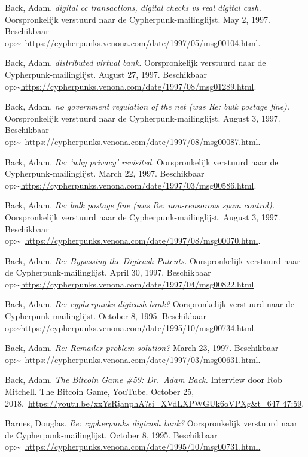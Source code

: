 \documentclass[smalldemyvopaper,11pt,twoside,onecolumn,openright,extrafontsizes,hidelinks]{memoir}
\begin{document}
Back, Adam. \emph{digital cc transactions, digital checks vs real
digital cash.} Oorspronkelijk verstuurd naar de Cypherpunk-mailinglijst.
May 2, 1997. Beschikbaar
op:\textasciitilde~\url{https://cypherpunks.venona.com/date/1997/05/msg00104.html}.

Back, Adam. \emph{distributed virtual bank.} Oorspronkelijk verstuurd
naar de Cypherpunk-mailinglijst. August 27, 1997. Beschikbaar
op:\textasciitilde{}\url{https://cypherpunks.venona.com/date/1997/08/msg01289.html}.

Back, Adam. \emph{no government regulation of the net (was Re: bulk
postage fine).} Oorspronkelijk verstuurd naar de
Cypherpunk-mailinglijst. August 3, 1997. Beschikbaar
op:\textasciitilde~\url{https://cypherpunks.venona.com/date/1997/08/msg00087.html}.

Back, Adam. \emph{Re: `why privacy' revisited.} Oorspronkelijk verstuurd
naar de Cypherpunk-mailinglijst. March 22, 1997. Beschikbaar
op:\textasciitilde{}\url{https://cypherpunks.venona.com/date/1997/03/msg00586.html}.

Back, Adam. \emph{Re: bulk postage fine (was Re: non-censorous spam
control).} Oorspronkelijk verstuurd naar de Cypherpunk-mailinglijst.
August 3, 1997. Beschikbaar
op:\textasciitilde~\url{https://cypherpunks.venona.com/date/1997/08/msg00070.html}.

Back, Adam. \emph{Re: Bypassing the Digicash Patents.} Oorspronkelijk
verstuurd naar de Cypherpunk-mailinglijst. April 30, 1997. Beschikbaar
op:\textasciitilde{}\url{https://cypherpunks.venona.com/date/1997/04/msg00822.html}.

Back, Adam. \emph{Re: cypherpunks digicash bank?} Oorspronkelijk
verstuurd naar de Cypherpunk-mailinglijst. October 8, 1995. Beschikbaar
op:\textasciitilde{}\url{https://cypherpunks.venona.com/date/1995/10/msg00734.html}.

Back, Adam. \emph{Re: Remailer problem solution?} March 23, 1997.
Beschikbaar
op:\textasciitilde~\url{https://cypherpunks.venona.com/date/1997/03/msg00631.html}.

Back, Adam. \emph{The Bitcoin Game \#59: Dr.~Adam Back.} Interview door
Rob Mitchell. The Bitcoin Game, YouTube. October 25,
2018.~\href{https://youtu.be/xxYsRjanphA?si=XVdLXPWGUk6oVPXg&t=647\%2047:59}{https://youtu.be/xxYsRjanphA?si=XVdLXPWGUk6oVPXg\&t=647
47:59}.

Barnes, Douglas. \emph{Re: cypherpunks digicash bank?} Oorspronkelijk
verstuurd naar de Cypherpunk-mailinglijst. October 8, 1995. Beschikbaar
op:\textasciitilde~\url{https://cypherpunks.venona.com/date/1995/10/msg00731.html.}
\end{document}
